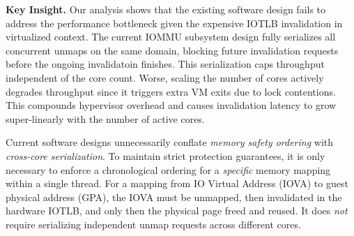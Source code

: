 
\textbf{Key Insight.}
Our analysis shows that the existing software design fails to address the performance bottleneck
    given the expensive IOTLB invalidation in virtualized context. 
The current IOMMU subsystem design fully serializes all concurrent unmaps on the same domain,
    blocking future invalidation requests before the ongoing invalidatoin finishes.
This serialization caps throughput independent of the core count.
Worse, scaling the number of cores actively degrades throughput since it triggers extra VM exits due to lock contentions.
This compounds hypervisor overhead and causes invalidation latency to grow super-linearly with the number of active cores.

Current software designs unnecessarily conflate
\emph{memory safety ordering} with \emph{cross-core serialization}.
To maintain strict protection guarantees,
it is only necessary to enforce a chronological ordering
for a \emph{specific} memory mapping within a single thread.
For a mapping from IO Virtual Address (IOVA) to guest physical address (GPA),
the IOVA must be unmapped, then invalidated in the hardware IOTLB, and only then the physical page freed and reused.
It does \emph{not} require serializing independent unmap requests across different cores.


